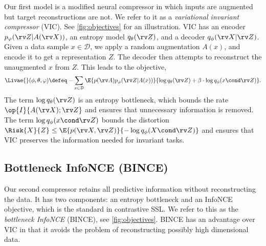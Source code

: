 \documentclass[final]{article}
\begin{document}
Our first model is a modified neural compressor in which inputs are augmented but target reconstructions are not.
We refer to it as a \textit{variational invariant compressor} (VIC).
See \cref{fig:objectives} for an illustration.
VIC has an encoder $p_\varphi(\rv Z| A(\rv X))$, an entropy model $q_\theta(\rv Z)$, and a decoder $q_\phi(\rv X | \rv Z)$.
Given a data sample $x \in \mathcal{D}$, we apply a random augmentation $A(x)$, and encode it to get a representation $Z$.
The decoder then attempts to reconstruct the unaugmented $x$ from $Z$. This leads to the objective,
\begin{equation}\label{eq:invariant_vae}
\Livae{}(\phi, \theta, \varphi)
\defeq
-
\sum_{x \in \mathcal{D}}
\E{p(\rv A)p_\varphi(\rv Z|A(x))}{
\log q_\theta(\rv Z) + \beta \cdot \log q_\phi(x \cond \rv Z)}.
\end{equation}
The term $\log q_\theta(\rv Z)$ is an entropy bottleneck, which bounds the rate $\op{I}{A(\rv X); \rv Z}$ and ensures that unnecessary information is removed.
The term $\log q_\phi(x \cond \rv Z)$ bounds the distortion $\Risk{X}{Z} \leq  \E{p(\rv X, \rv Z)} {-\log q_\phi(X \cond \rv Z)} $ and ensures that VIC preserves the information needed for invariant tasks.




\subsection{Bottleneck InfoNCE (BINCE)}
\label{sec:BINCE}



Our second compressor retains all predictive information without reconstructing the data. It has two components: an entropy bottleneck and an InfoNCE \cite{oord_representation_2019} objective, which is the standard in contrastive SSL. We refer to this as the \textit{bottleneck InfoNCE} (BINCE), see \cref{fig:objectives}. BINCE has an advantage over VIC in that it avoids the problem of reconstructing possibly  high dimensional data.
\end{document}
